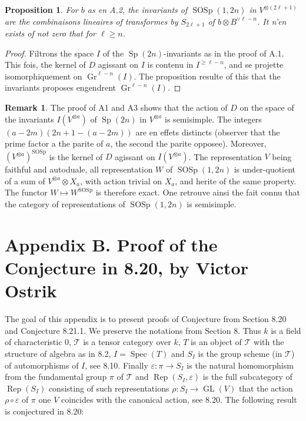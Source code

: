 \documentclass[11pt,a4paper]{article}
\theoremstyle{plain}
\newtheorem{proposition}[theorem]{Proposition}
\theoremstyle{definition}
\newtheorem{remark}[theorem]{Remark}
\DeclareMathOperator{\Spec}{Spec}
\DeclareMathOperator{\Rep}{Rep}
\DeclareMathOperator{\GL}{GL}
\DeclareMathOperator{\Sp}{Sp}
\DeclareMathOperator{\SOSp}{SOSp}
\newcommand{\eps}{\varepsilon}
\DeclareMathOperator{\Gr}{Gr}
\begin{document}
\begin{proposition}
For $b$ as en A.2, the invariants of $\SOSp(1, 2n)$ in $V^{\otimes (2\ell+1)}$ are the combinaisons lineaires of transformes by $S_{2\ell+1}$ of $b \otimes B^{\vee \ell-n}$. It n'en exists of not zero that for $\ell \geq n$.
\end{proposition}

\begin{proof}
Filtrons the space $I$ of the $\Sp(2n)$-invariants as in the proof of A.1. This fois, the kernel of $D$ agissant on $I$ is contenu in $I^{\geq \ell-n}$, and se projette isomorphiquement on $\Gr^{\ell-n}(I)$. The proposition resulte of this that the invariants proposes engendrent $\Gr^{\ell-n}(I)$.
\end{proof}

\begin{remark}
The proof of A1 and A3 shows that the action of $D$ on the space of the invariants $I(V^{\otimes a})$ of $\Sp(2n)$ in $V^{\otimes a}$ is semisimple. The integers $(a - 2m)(2n + 1 - (a - 2m))$ are en effets distincts (observer that the prime factor a the parite of $a$, the second the parite opposee). Moreover, $(V^{\otimes a})^{\SOSp}$ is the kernel of $D$ agissant on $I(V^{\otimes a})$. The representation $V$ being faithful and autoduale, all representation $W$ of $\SOSp(1, 2n)$ is under-quotient of a sum of $V^{\otimes a} \otimes X_a$, with action trivial on $X_a$, and herite of the same property. The functor $W \mapsto W^{\SOSp}$ is therefore exact. One retrouve ainsi the fait connu that the category of representations of $\SOSp(1, 2n)$ is semisimple.
\end{remark}


\section*{Appendix B. Proof of the Conjecture in 8.20, by Victor Ostrik}

The goal of this appendix is to present proofs of Conjecture from Section 8.20 and Conjecture 8.21.1. We preserve the notations from Section 8. Thus $k$ is a field of characteristic $0$, $\mathcal{T}$ is a tensor category over $k$, $T$ is an object of $\mathcal{T}$ with the structure of algebra as in 8.2, $I = \Spec(T)$ and $S_I$ is the group scheme (in $\mathcal{T}$) of automorphisms of $I$, see 8.10. Finally $\eps : \pi \to S_I$ is the natural homomorphism from the fundamental group $\pi$ of $\mathcal{T}$ and $\Rep(S_I, \eps)$ is the full subcategory of $\Rep(S_I)$ consisting of such representations $\rho : S_I \to \GL(V)$ that the action $\rho \circ \eps$ of $\pi$ one $V$ coincides with the canonical action, see 8.20. The following result is conjectured in 8.20:
\end{document}
